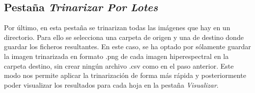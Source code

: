 
\subsection{Pestaña \textit{Trinarizar Por Lotes}}
Por último, en esta pestaña se trinarizan todas las imágenes que hay en un directorio. Para ello se selecciona una carpeta de origen y una de destino donde guardar los ficheros resultantes. En este caso, se ha optado por sólamente guardar la imagen trinarizada en formato .png de cada imagen hiperespectral en la carpeta destino, sin crear ningún archivo .csv como en el paso anterior. Este modo nos permite aplicar la trinarización de forma más rápida y posteriormente poder visualizar los resultados para cada hoja en la pestaña \textit{Visualizar}.


